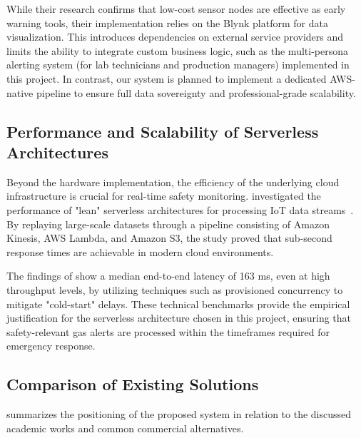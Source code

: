 \documentclass[conference,a4paper,flushend]{cs-techrep} %
\begin{document}
While their research confirms that low-cost sensor nodes are effective as early warning tools, their implementation 
relies on the Blynk platform for data visualization. This introduces dependencies on external service providers and 
limits the ability to integrate custom business logic, such as the multi-persona alerting system (for lab technicians 
and production managers) implemented in this project. In contrast, our system is planned to implement a dedicated AWS-native 
pipeline to ensure full data sovereignty and professional-grade scalability.

\subsection{Performance and Scalability of Serverless Architectures}\label{sec:performance_scalability}

Beyond the hardware implementation, the efficiency of the underlying cloud infrastructure is crucial for real-time 
safety monitoring. \citeauthor{Gudduri2025} investigated the performance of "lean" serverless 
architectures for processing IoT data streams~\cite{Gudduri2025}. By replaying large-scale datasets through a pipeline consisting of 
Amazon Kinesis, AWS Lambda, and Amazon S3, the study proved that sub-second response times are achievable in modern 
cloud environments.

The findings of \citeauthor{Gudduri2025} show a median end-to-end latency of 163 ms, even at high throughput levels, by utilizing techniques 
such as provisioned concurrency to mitigate "cold-start" delays. These technical benchmarks provide the empirical 
justification for the serverless architecture chosen in this project, ensuring that safety-relevant gas alerts are 
processed within the timeframes required for emergency response.

\subsection{Comparison of Existing Solutions}\label{sec:comparison_solutions}

 summarizes the positioning of the proposed system in relation to the discussed academic 
works and common commercial alternatives.
\end{document}
